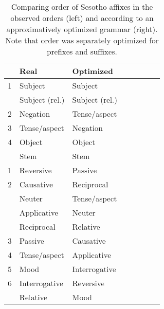 \begin{table}
    \centering
    \begin{tabular}{llllllll}
	    &	    Real & Optimized \\ \hline\hline
	    1 & Subject & Subject \\
	      & Subject (rel.) & Subject (rel.) \\
	    2 & Negation & Tense/aspect \\
	    3& Tense/aspect & Negation \\
	    4 &Object & Object \\ \hline
	    &Stem & Stem  \\ \hline
	    1 & Reversive & Passive \\
	    2& Causative & Reciprocal \\
	    &Neuter & Tense/aspect \\
	    &Applicative & Neuter \\
	    &Reciprocal & Relative \\
	    3&Passive & Causative \\
	    4&Tense/aspect & Applicative \\
	    5&Mood & Interrogative \\
	    6&Interrogative & Reversive \\
	    &Relative & Mood \\ \hline
    \end{tabular}
	\caption{Comparing order of Sesotho affixes in the observed orders (left) and according to an approximatively optimized grammar (right). Note that order was separately optimized for prefixes and suffixes.}
    \label{tab:grammar-table-sesotho}
\end{table}

